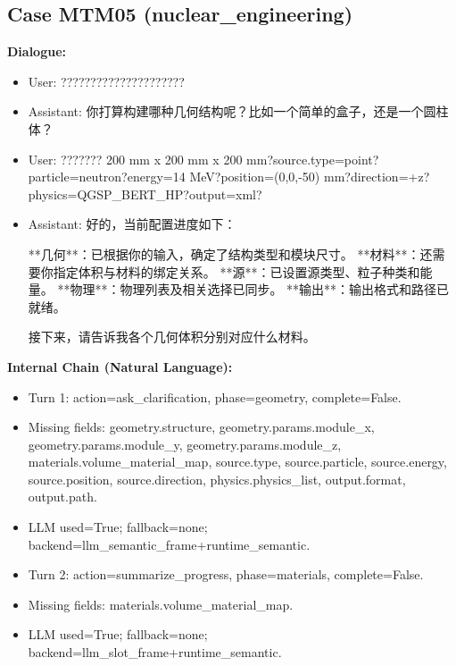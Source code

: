 \documentclass[11pt]{ctexart}
\begin{document}
\subsection{Case MTM05 (nuclear\_engineering)}
\textbf{Dialogue:}
\begin{itemize}
\item User: ?????????????????????
\item Assistant: 你打算构建哪种几何结构呢？比如一个简单的盒子，还是一个圆柱体？
\item User: ??????? 200 mm x 200 mm x 200 mm?source.type=point?particle=neutron?energy=14 MeV?position=(0,0,-50) mm?direction=+z?physics=QGSP\_BERT\_HP?output=xml?
\item Assistant: 好的，当前配置进度如下：

**几何**：已根据你的输入，确定了结构类型和模块尺寸。
**材料**：还需要你指定体积与材料的绑定关系。
**源**：已设置源类型、粒子种类和能量。
**物理**：物理列表及相关选择已同步。
**输出**：输出格式和路径已就绪。

接下来，请告诉我各个几何体积分别对应什么材料。
\end{itemize}
\textbf{Internal Chain (Natural Language):}
\begin{itemize}
\item Turn 1: action=ask\_clarification, phase=geometry, complete=False.
\item Missing fields: geometry.structure, geometry.params.module\_x, geometry.params.module\_y, geometry.params.module\_z, materials.volume\_material\_map, source.type, source.particle, source.energy, source.position, source.direction, physics.physics\_list, output.format, output.path.
\item LLM used=True; fallback=none; backend=llm\_semantic\_frame+runtime\_semantic.
\item Turn 2: action=summarize\_progress, phase=materials, complete=False.
\item Missing fields: materials.volume\_material\_map.
\item LLM used=True; fallback=none; backend=llm\_slot\_frame+runtime\_semantic.
\end{itemize}
\end{document}
